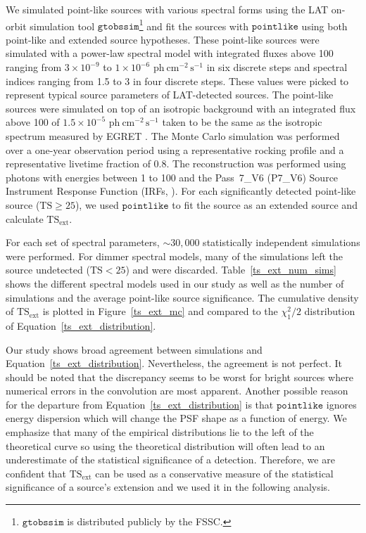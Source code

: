 \documentclass[12pt,preprint]{aastex}
\newcommand{\mev}{\text{MeV}\xspace}
\newcommand{\gev}{\text{GeV}\xspace}
\newcommand{\phflux}{\ensuremath{\text{ph}\ \text{cm}^{-2}\,\text{s}^{-1}}\xspace}
\newcommand{\tsext}{{\ensuremath{\text{TS}_{\text{ext}}}}\xspace}
\newcommand{\ts}{\text{TS}\xspace}
\newcommand{\pointlike}{\ensuremath{\mathtt{pointlike}}\xspace}
\newcommand{\gtobssim}{\ensuremath{\mathtt{gtobssim}}\xspace}
\begin{document}
We simulated point-like sources with various spectral forms using
the LAT on-orbit simulation tool
\gtobssim\footnote{\gtobssim is distributed publicly by the FSSC.} and fit the sources
with \pointlike using both point-like
and extended source hypotheses.  These point-like sources were simulated with a power-law
spectral model with integrated fluxes above 100 \mev ranging from $3\times10^{-9}$ 
to $1\times10^{-6}$ \phflux in six discrete steps and spectral
indices ranging from 1.5 to 3 in four discrete steps.  These values
were picked to represent typical source parameters of LAT-detected
sources. The point-like sources were simulated on top of an isotropic
background with an integrated flux above 100 \mev of $1.5\times10^{-5}$ \phflux
taken to be the same as the isotropic spectrum measured by EGRET
\citep{sreekumar_isotropic}.  The Monte Carlo simulation was performed
over a one-year observation period using a representative rocking profile and a
representative livetime fraction of 0.8.  The reconstruction was performed
using photons with energies between 1 \gev to 100 \gev 
and the Pass~7\_V6 (P7\_V6) Source Instrument
Response Function (IRFs, \cite{lat_on_orbit_psf}).  For each 
significantly detected point-like source ($\ts\ge25$), we used \pointlike
to fit the source as an extended source and calculate \tsext.


For each set of spectral parameters, $\sim30,000$ statistically independent
simulations were performed. For dimmer spectral models, many of the
simulations left the source undetected ($\ts<25$)
and were discarded.  Table~\ref{ts_ext_num_sims}
shows the different spectral models used in our study as well as the
number of simulations and the average point-like source
significance.  The cumulative density of \tsext is plotted in
Figure~\ref{ts_ext_mc} and compared to the $\chi^2_1/2$ distribution of
Equation~\ref{ts_ext_distribution}.

Our study shows broad agreement between simulations and
Equation~\ref{ts_ext_distribution}. Nevertheless, the agreement is not
perfect.  It should be noted that the discrepancy seems to be worst for
bright sources where numerical errors in the convolution
are most apparent.  Another possible
reason for the departure from Equation~\ref{ts_ext_distribution} 
is that \pointlike ignores energy dispersion which will change the
PSF shape as a function of energy. We emphasize that many of
the empirical distributions lie to the left of the theoretical curve so
using the theoretical distribution will often lead to an underestimate of the
statistical significance of a detection. Therefore, we are confident that
\tsext can be used as a conservative measure of the statistical
significance of a source's extension and we used it in the following analysis.
\end{document}
